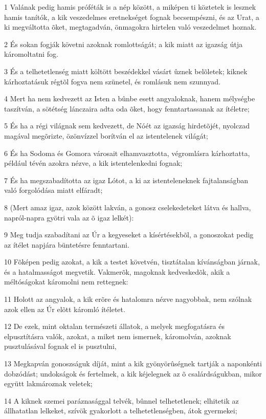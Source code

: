 \par 1 Valának pedig hamis próféták is a nép között, a miképen ti köztetek is lesznek hamis tanítók, a kik veszedelmes eretnekséget fognak becsempészni, és az Urat, a ki megváltotta õket, megtagadván, önmagokra hirtelen való veszedelmet hoznak.
\par 2 És sokan fogják követni azoknak romlottságát; a kik miatt az igazság útja káromoltatni fog.
\par 3 És a telhetetlenség miatt költött beszédekkel vásárt ûznek belõletek; kiknek kárhoztatásuk régtõl fogva nem szünetel, és romlásuk nem szunnyad.
\par 4 Mert ha nem kedvezett az Isten a bûnbe esett angyaloknak, hanem mélységbe taszítván, a sötétség lánczaira adta oda õket, hogy fenntartassanak az ítéletre;
\par 5 És ha a régi világnak sem kedvezett, de Nóét az igazság hirdetõjét, nyolczad magával megõrizte, özönvízzel borítván el az istentelenek világát;
\par 6 És ha Sodoma és Gomora városait elhamvasztotta, végromlásra kárhoztatta, például tévén azokra nézve, a kik istentelenkedni fognak;
\par 7 És ha megszabadította az igaz Lótot, a ki az istenteleneknek fajtalanságban való forgolódása miatt elfáradt;
\par 8 (Mert amaz igaz, azok között lakván, a gonosz cselekedeteket látva és hallva, napról-napra gyötri vala az õ igaz lelkét):
\par 9 Meg tudja szabadítani az Úr a kegyeseket a kísértésekbõl, a gonoszokat pedig az ítélet napjára büntetésre fenntartani.
\par 10 Fõképen pedig azokat, a kik a testet követvén, tisztátalan kívánságban járnak, és a hatalmasságot megvetik. Vakmerõk, magoknak kedveskedõk, akik a méltóságokat káromolni nem  rettegnek:
\par 11 Holott az angyalok, a kik erõre és hatalomra nézve nagyobbak, nem szólnak azok ellen az Úr elõtt káromló ítéletet.
\par 12 De ezek, mint oktalan természeti állatok, a melyek megfogatásra és elpusztításra valók, azokat, a miket nem ismernek, káromolván, azoknak pusztulásával fognak el is pusztulni,
\par 13 Megkapván gonoszságuk díját, mint a kik gyönyörûségnek tartják a naponkénti dobzódást; undokságok és fertelmek, a kik kéjelegnek az õ csalárdságukban, mikor együtt lakmároznak veletek;
\par 14 A kiknek szemei paráznasággal telvék, bûnnel telhetetlenek; elhitetik az állhatatlan lelkeket, szívök gyakorlott a telhetetlenségben, átok gyermekei;
